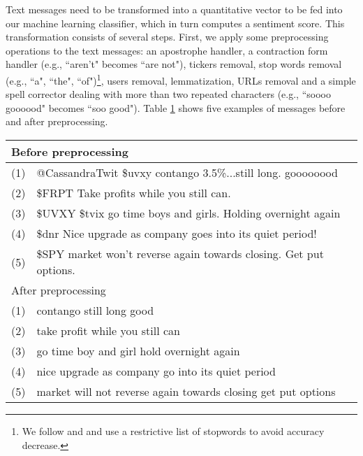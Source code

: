 Text messages need to be transformed into a quantitative vector to be fed into our machine learning classifier, which in turn computes a sentiment score. This transformation consists of several steps. First, we apply some preprocessing operations to the text messages: an apostrophe handler, a contraction form handler (e.g., ``aren't" becomes ``are not"), tickers removal, stop words removal (e.g., ``a", ``the", ``of")\footnote{We follow \citet{renault2020sentiment} and \citet{saif2014stopwords} and use a restrictive list of stopwords to avoid accuracy decrease.}, users removal, lemmatization, URLs removal and a simple spell corrector dealing with more than two repeated characters (e.g., ``soooo goooood" becomes ``soo good"). Table \ref{tab:preprocess} shows five examples of messages before and after preprocessing.


\begin{table}[h]
\centering
\begin{tabular}{ll} \hline
\multicolumn{2}{l}{Before preprocessing}                                   \\ \hline  
(1) & @CassandraTwit \$uvxy contango 3.5\%...still long. goooooood        \\
(2) & \$FRPT Take profits while you still can.                            \\
(3) & \$UVXY \$tvix go time boys and girls. Holding overnight again       \\
(4) & \$dnr Nice upgrade as company goes into its quiet period!           \\
(5) & \$SPY market won't reverse again towards closing. Get put options.  \\ \hline   \hline
\multicolumn{2}{l}{After preprocessing}                                   \\ \hline 
(1) & contango still long good                                            \\
(2) & take profit while you still can                                     \\
(3) & go time boy and girl hold overnight again                           \\
(4) & nice upgrade as company go into its quiet period                    \\
(5) & market will not reverse again towards closing get put options      \\ \hline
\end{tabular}
\label{tab:preprocess}
\end{table}


